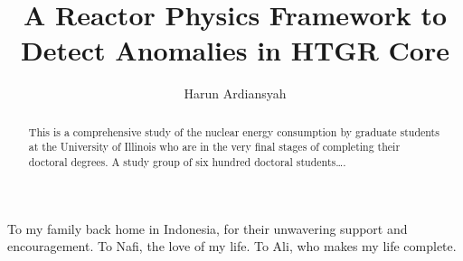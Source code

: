 \documentclass{uiucthesis2021}
\begin{document}
\title{A Reactor Physics Framework to Detect Anomalies in HTGR Core}
\author{Harun Ardiansyah}
\phdthesis
{}
\maketitle

\frontmatter



\begin{abstract}
This is a comprehensive study of the nuclear energy consumption by graduate
students at the University of Illinois who are in the very final
stages of completing their doctoral degrees. A study group of six
hundred doctoral students\ldots.
\end{abstract}

\begin{dedication}
To my family back home in Indonesia, for their unwavering support and encouragement. To Nafi, the love of my life. To Ali, who makes my life complete.
\end{dedication}
\end{document}
